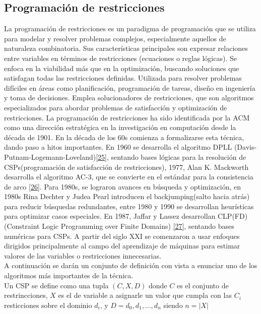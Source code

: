     \subsection*{ \Large Programación de restricciones}

La programación de restricciones es un paradigma de programación que se utiliza para modelar y resolver problemas complejos, especialmente aquellos de naturaleza
combinatoria. Sus características principales son expresar relaciones entre variables en términos de restricciones (ecuaciones o reglas lógicas). Se enfoca en la
viabilidad más que en la optimización, buscando soluciones que satisfagan todas las restricciones definidas. Utilizada para resolver problemas difíciles en áreas
como planificación, programación de tareas, diseño en ingeniería y toma de decisiones. Emplea solucionadores de restricciones, que son algoritmos especializados
para abordar problemas de satisfacción y optimización de restricciones. La programación de restricciones ha sido identificada por la ACM como una dirección estratégica
en la investigación en computación desde la década de 1901. En la década de los 60s comienza a formalizarse esta técnica, dando paso a hitos importantes. En 1960
se desarrolla el algoritmo DPLL (Davis-Putnam-Logemann-Loveland)\hyperref[sec:35]{[25]}, sentando bases lógicas para la resolución de CSPs(programación de satisfacción de restricciones), 1977, Alan K. Mackworth
desarrolla el algoritmo AC-3, que se convierte en el estándar para la consistencia de arco \hyperref[sec:36]{[26]}. Para 1980s, se lograron avances en búsqueda y optimización, en 1980s Rina
Dechter y Judea Pearl introducen el backjumping(salto hacia atrás) para reducir búsquedas redundantes, entre 1980 y 1990 se desarrollan heurísticas para optimizar
casos especiales. En 1987, Jaffar y Lassez desarrollan CLP(FD) (Constraint Logic Programming over Finite Domains) \hyperref[sec:37]{[27]}, sentando bases numéricas para CSPs. A partir del siglo XXI se comenzaron a usar
enfoques dirigidos principalmente al campo del aprendizaje de máquinas para estimar valores de las variables o restricciones innecesarias. \\

A continuación se darán un conjunto de definición con vista a enunciar uno de los algoritmos más importantes de la técnica. \\

Un CSP se define como una tupla $(C,X,D)$ donde $C$ es el conjunto de restrincciones, $X$ es el de variable a asignarle un valor que cumpla con las $C_i$ resticciones 
sobre el dominio $d_i$, y $D={d_0,d_1,...,d_n}$ siendo $n=|X|$ \\

